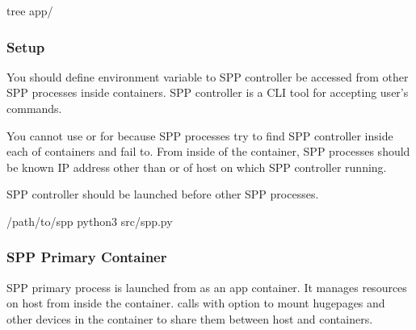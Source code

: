 \documentclass[a4paper,11pt,openany,oneside,english]{sphinxmanual}
\begin{document}
\begin{sphinxVerbatim}[commandchars=\\\{\},formatcom=\footnotesize]
 tree app/
\end{sphinxVerbatim}


\subsubsection{Setup}
\label{\detokenize{tools/sppc/app_launcher:setup}}\label{\detokenize{tools/sppc/app_launcher:sppc-appl-setup}}
You should define  environment variable to SPP controller
be accessed from other SPP processes inside containers.
SPP controller is a CLI tool for accepting user’s commands.

You cannot use  or  for 
because SPP processes try to find SPP controller inside each of
containers and fail to.
From inside of the container, SPP processes should be known IP address
other than  or 
of host on which SPP controller running.

SPP controller should be launched before other SPP processes.

\begin{sphinxVerbatim}[commandchars=\\\{\},formatcom=\footnotesize]
  /path/to/spp
 python3 src/spp.py
\end{sphinxVerbatim}


\subsubsection{SPP Primary Container}
\label{\detokenize{tools/sppc/app_launcher:spp-primary-container}}\label{\detokenize{tools/sppc/app_launcher:sppc-appl-spp-primary}}
SPP primary process is launched from  as an
app container.
It manages resources on host from inside the container.
 calls  with
 option to mount hugepages and other devices in the container
to share them between host and containers.
\end{document}
